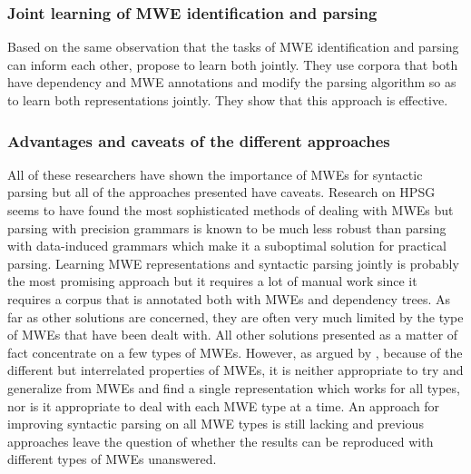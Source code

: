 \documentclass[output=paper]{LSP/langsci}
\begin{document}
                        \subsubsection{Joint learning of MWE identification and parsing}
                        \indent Based on the same observation that the tasks of MWE identification and parsing can inform each other, \citet{constant2016transition} propose to learn both jointly. They use corpora that both have dependency and MWE annotations and modify the parsing algorithm so as to learn both representations jointly. They show that this approach is effective. 

                        \subsubsection{Advantages and caveats of the different approaches}
                        \indent All of these researchers have shown the importance of MWEs for syntactic parsing but all of the approaches presented have caveats. Research on HPSG seems to have found the most sophisticated methods of dealing with MWEs but parsing with precision grammars is known to be much less robust \citep{zhang08robustparsing} than parsing with data-induced grammars which make it a suboptimal solution for practical parsing. Learning MWE representations and syntactic parsing jointly is probably the most promising approach but it requires a lot of manual work since it requires a corpus that is annotated both with MWEs and dependency trees. As far as other solutions are concerned, they are often very much limited by the type of MWEs that have been dealt with. All other solutions presented as a matter of fact concentrate on a few types of MWEs. However, as argued by \citet{kim2008}, because of the different but interrelated properties of MWEs, it is neither appropriate to try and generalize from MWEs and find a single representation which works for all types, nor is it appropriate to deal with each MWE type at a time. An approach for improving syntactic parsing on all MWE types is still lacking and previous approaches leave the question of whether the results can be reproduced with different types of MWEs unanswered. 
\end{document}
